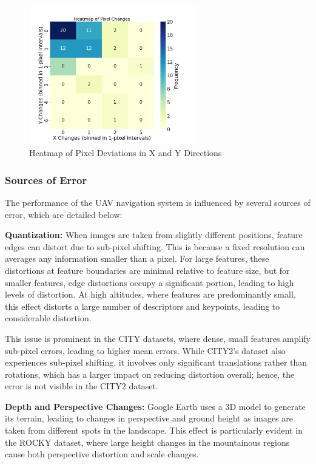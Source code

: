 \begin{figure}[H]
    \centering
    \includegraphics[width=0.65\textwidth]{Chapter 5/RESULTPLOTS/XYHEAT.png}
    \caption{Heatmap of Pixel Deviations in X and Y Directions}
    \label{fig:Heatmap_XY_Dev}
\end{figure}



\subsubsection{Sources of Error}

The performance of the UAV navigation system is influenced by several sources of error, which are detailed below:


\textbf{Quantization:} 
When images are taken from slightly different positions, feature edges can distort due to sub-pixel shifting. This is because a fixed resolution can averages any information smaller than a pixel. For large features, these distortions at feature boundaries are minimal relative to feature size, but for smaller features, edge distortions occupy a significant portion, leading to high levels of distortion. At high altitudes, where features are predominantly small, this effect distorts a large number of descriptors and keypoints, leading to considerable distortion.

This issue is prominent in the CITY datasets, where dense, small features amplify sub-pixel errors, leading to higher mean errors. While CITY2’s dataset also experiences sub-pixel shifting, it involves only significant translations rather than rotations, which has a larger impact on reducing distortion overall; hence, the error is not visible in the CITY2 dataset.

\textbf{Depth and Perspective Changes:} Google Earth uses a 3D model to generate its terrain, leading to changes in perspective and ground height as images are taken from different spots in the landscape. This effect is particularly evident in the ROCKY dataset, where large height changes in the mountainous regions cause both perspective distortion and scale changes.

